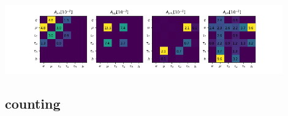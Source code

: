 \begin{frame}{}%
    \begin{center}
        \includegraphics[width=0.9\textwidth,trim=3cm 0 3cm 0, clip]{chapters/Analysis/sectionStatisticalAnalysis/figures/acc_mu1b.png}
    \end{center}
\end{frame}




\subsection{counting}

